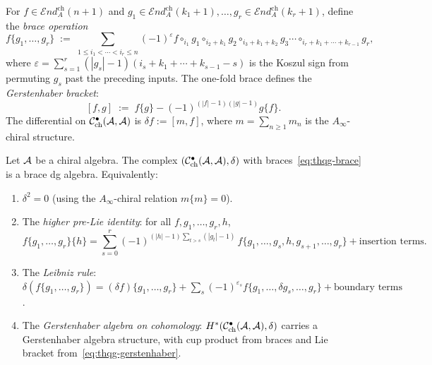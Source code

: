 \begin{definition}
\label{def:thqg-operadic-braces}
For $f \in \mathcal{E}\!nd^{\mathrm{ch}}_A(n+1)$ and
$g_1 \in \mathcal{E}\!nd^{\mathrm{ch}}_A(k_1 + 1), \ldots,
g_r \in \mathcal{E}\!nd^{\mathrm{ch}}_A(k_r + 1)$,
define the \emph{brace operation}
\begin{equation}\label{eq:thqg-brace}
f\{g_1, \ldots, g_r\}
\;:=\;
\sum_{1 \le i_1 < \cdots < i_r \le n}
(-1)^{\varepsilon}
f \circ_{i_1} g_1 \circ_{i_2 + k_1} g_2
\circ_{i_3 + k_1 + k_2} g_3
\cdots \circ_{i_r + k_1 + \cdots + k_{r-1}} g_r,
\end{equation}
where $\varepsilon = \sum_{s=1}^{r}
(|g_s| - 1)(i_s + k_1 + \cdots + k_{s-1} - s)$ is the
Koszul sign from permuting $g_s$ past the preceding inputs.
The one-fold brace defines the \emph{Gerstenhaber bracket}:
\begin{equation}\label{eq:thqg-gerstenhaber}
[f, g]
\;:=\;
f\{g\} - (-1)^{(|f|-1)(|g|-1)} g\{f\}.
\end{equation}
The differential on
$\mathcal{C}^{\bullet}_{\mathrm{ch}}(\mathcal{A}, \mathcal{A})$ is
$\delta f := [m, f]$, where
$m = \sum_{n \ge 1} m_n$ is the $A_\infty$-chiral
structure.
\end{definition}

\begin{theorem}
\label{thm:thqg-brace-dg-algebra}
Let $\mathcal{A}$ be a chiral algebra. The complex
$(\mathcal{C}^{\bullet}_{\mathrm{ch}}(\mathcal{A}, \mathcal{A}), \delta)$
with braces~\eqref{eq:thqg-brace} is a brace dg algebra.
Equivalently:
\begin{enumerate}[label=\textup{(\roman*)}]
\item $\delta^2 = 0$ (using the $A_\infty$-chiral
 relation $m\{m\} = 0$).

\item The \emph{higher pre-Lie identity}:
 for all $f, g_1, \ldots, g_r, h$,
 \begin{equation}\label{eq:thqg-higher-pre-lie}
 f\{g_1, \ldots, g_r\}\{h\}
 =
 \sum_{s=0}^{r}
 (-1)^{(|h|-1)\sum_{t>s}(|g_t|-1)}\,
 f\{g_1, \ldots, g_s, h, g_{s+1}, \ldots, g_r\}
 + \text{insertion terms}.
 \end{equation}

\item The \emph{Leibniz rule}:
 $\delta(f\{g_1, \ldots, g_r\})
 = (\delta f)\{g_1, \ldots, g_r\}
 + \sum_{s} (-1)^{\varepsilon_s}
 f\{g_1, \ldots, \delta g_s, \ldots, g_r\}
 + \text{boundary terms}$.

\item The \emph{Gerstenhaber algebra on cohomology}:
 $H^*(\mathcal{C}^{\bullet}_{\mathrm{ch}}(\mathcal{A}, \mathcal{A}), \delta)$
 carries a Gerstenhaber algebra structure, with cup product
 from braces and Lie bracket from~\eqref{eq:thqg-gerstenhaber}.
\end{enumerate}
\end{theorem}

